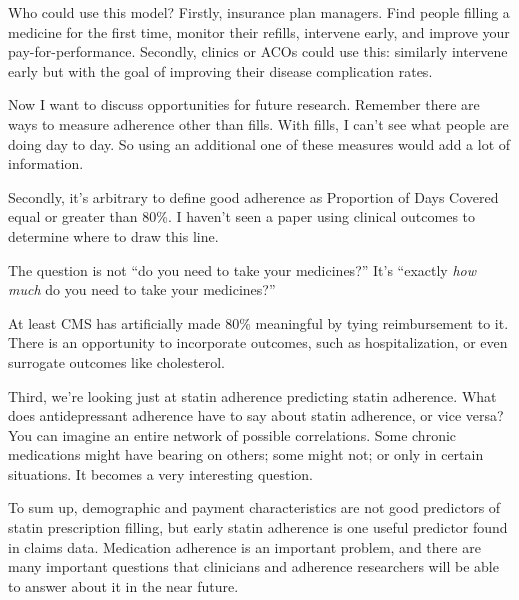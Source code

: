 \documentclass[12pt]{report}
\begin{document}
\begin{large}
Who could use this model? Firstly, insurance plan managers. Find
people filling a medicine for the first time, monitor their refills,
intervene early, and improve your pay-for-performance. Secondly,
clinics or ACOs could use this: similarly intervene early but with the
goal of improving their disease complication rates.

Now I want to discuss opportunities for future research. Remember
there are ways to measure adherence other than fills. With fills, I
can't see what people are doing day to day. So using an additional one
of these measures would add a lot of information.

Secondly, it's arbitrary to define good adherence as Proportion of
Days Covered equal or greater than 80\%. I haven't seen a paper using
clinical outcomes to determine where to draw this line.

\end{large}

The question is not ``do you need to take your medicines?'' It's
``exactly \emph{how much} do you need to take your medicines?''

\begin{large}

At least CMS has artificially made 80\% meaningful by tying
reimbursement to it. There is an opportunity to incorporate outcomes,
such as hospitalization, or even surrogate outcomes like cholesterol.

Third, we're looking just at statin adherence predicting statin
adherence. What does antidepressant adherence have to say about statin
adherence, or vice versa? You can imagine an entire network of
possible correlations. Some chronic medications might have bearing on
others; some might not; or only in certain situations. It becomes a
very interesting question.

To sum up, demographic and payment characteristics are not good
predictors of statin prescription filling, but early statin adherence
is one useful predictor found in claims data. Medication adherence is
an important problem, and there are many important questions that
clinicians and adherence researchers will be able to answer about it
in the near future.


\end{large}
\end{document}
